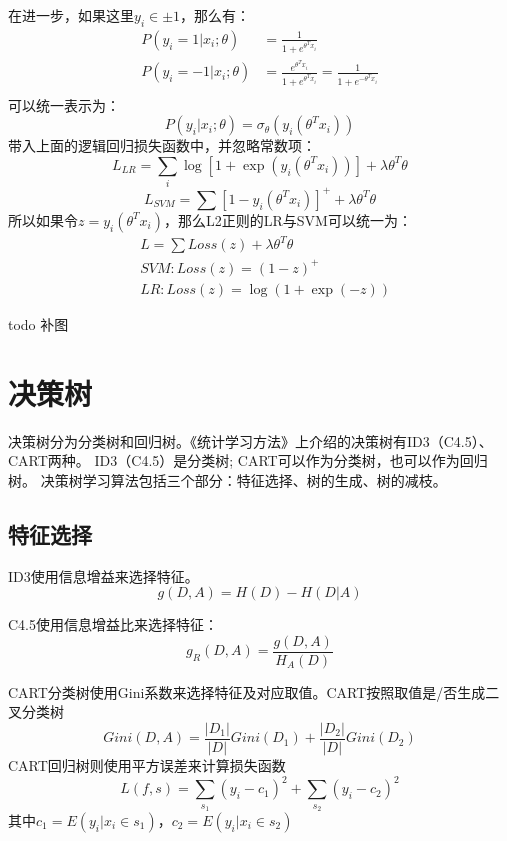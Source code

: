 在进一步，如果这里$y_i \in \pm 1$，那么有：
\begin{align*}
    P(y_i=1 |x_i;\theta) &= \frac{1}{1+e^{\theta^T x_i}} \\
    P(y_i=-1|x_i;\theta) &= \frac{e^{\theta^T x_i}}{1+e^{\theta^T x_i}} = \frac{1}{1+e^{-\theta^T x_i}}\\
\end{align*}
可以统一表示为：
\begin{equation*}
    P(y_i|x_i;\theta) = \sigma_\theta(y_i(\theta^T x_i))
\end{equation*}
带入上面的逻辑回归损失函数中，并忽略常数项：
\begin{equation*}
    L_{LR} = \sum_i \log [1+\exp(y_i(\theta^T x_i))] + \lambda \theta^T\theta
\end{equation*}
\begin{equation*}
    L_{SVM} = \sum \left[1 - y_i(\theta^T x_i)\right]^+ + \lambda \theta^T\theta
\end{equation*}
所以如果令$z = y_i(\theta^T x_i)$，那么L2正则的LR与SVM可以统一为：
\begin{align*}
    & L = \sum Loss(z) + \lambda \theta^T\theta \\
    & SVM: Loss(z) = (1-z)^+ \\
    & LR: Loss(z) = \log (1+\exp(-z))
\end{align*}

todo 补图

\section{决策树}
决策树分为分类树和回归树。《统计学习方法》上介绍的决策树有ID3（C4.5）、CART两种。
ID3（C4.5）是分类树; CART可以作为分类树，也可以作为回归树。
决策树学习算法包括三个部分：特征选择、树的生成、树的减枝。
\subsection{特征选择}
ID3使用信息增益来选择特征。
\begin{equation*}
    g(D,A) = H(D) - H(D|A)
\end{equation*}

C4.5使用信息增益比来选择特征：
\begin{equation*}
    g_R(D,A) = \frac{g(D,A)}{H_A(D)}
\end{equation*}

CART分类树使用Gini系数来选择特征及对应取值。CART按照取值是/否生成二叉分类树
\begin{equation*}
    Gini(D,A) = \frac{|D_1|}{|D|}Gini(D_1) + \frac{|D_2|}{|D|}Gini(D_2)
\end{equation*}
CART回归树则使用平方误差来计算损失函数
\begin{equation*}
    L(f,s) = \sum_{s_1} (y_i - c_1)^2 + \sum_{s_2} (y_i - c_2)^2
\end{equation*}
其中$c_1 = E(y_i|x_i \in s_1)$，$c_2 = E(y_i|x_i \in s_2)$


